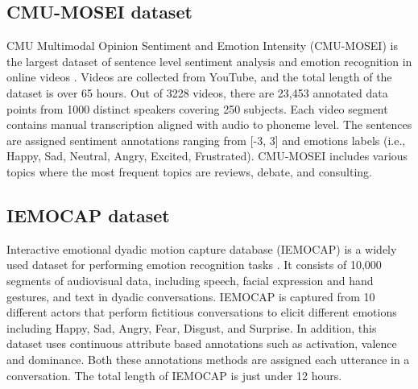 \subsection{CMU-MOSEI dataset}
CMU Multimodal Opinion Sentiment and Emotion Intensity (CMU-MOSEI) is the largest dataset of sentence level sentiment analysis and emotion recognition in online videos \cite{MSA_review2_GANDHI2023424} \cite{cmu-mosei_zadeh2018multimodal}. Videos are collected from YouTube, and the total length of the dataset is over 65 hours. Out of 3228 videos, there are 23,453 annotated data points from 1000 distinct speakers covering 250 subjects. Each video segment contains manual transcription aligned with audio to phoneme level. The sentences are assigned sentiment annotations ranging from [-3, 3] and emotions labels (i.e., Happy, Sad, Neutral, Angry, Excited, Frustrated). CMU-MOSEI includes various topics where the most frequent topics are reviews, debate, and consulting. 

\subsection{IEMOCAP dataset}
Interactive emotional dyadic motion capture database (IEMOCAP) is a widely used dataset for performing emotion recognition tasks \cite{iemocap_dataset}. It consists of 10,000 segments of audiovisual data, including speech, facial expression and hand gestures, and text in dyadic conversations. IEMOCAP is captured from 10 different actors that perform fictitious conversations to elicit different emotions including Happy, Sad, Angry, Fear, Disgust, and Surprise. In addition, this dataset uses continuous attribute based annotations such as activation, valence and dominance. Both these annotations methods are assigned each utterance in a conversation. The total length of IEMOCAP is just under 12 hours. \\


